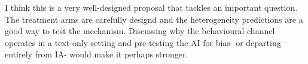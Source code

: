 \documentclass[11pt,a4paper]{article}
\begin{document}
\noindent I think this is a very well-designed proposal that tackles an important question. The treatment arms are carefully designd and the heterogeneity predictions are a good way to test the mechanism. Discussing why the behavioural channel operates in a text-only setting and pre-testing the AI for bias- or departing entirely from IA- would make it perhaps stronger.
\end{document}
